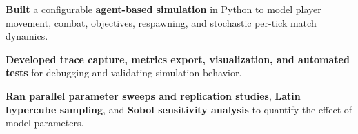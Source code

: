 \begin{bullets}
    \item \textbf{Built} a configurable \textbf{agent-based simulation} in Python to model player movement, combat, objectives, respawning, and stochastic per-tick match dynamics.
    \item \textbf{Developed trace capture, metrics export, visualization, and automated tests} for debugging and validating simulation behavior.
    \item \textbf{Ran parallel parameter sweeps and replication studies}, \textbf{Latin hypercube sampling}, and \textbf{Sobol sensitivity analysis} to quantify the effect of model parameters.
\end{bullets}